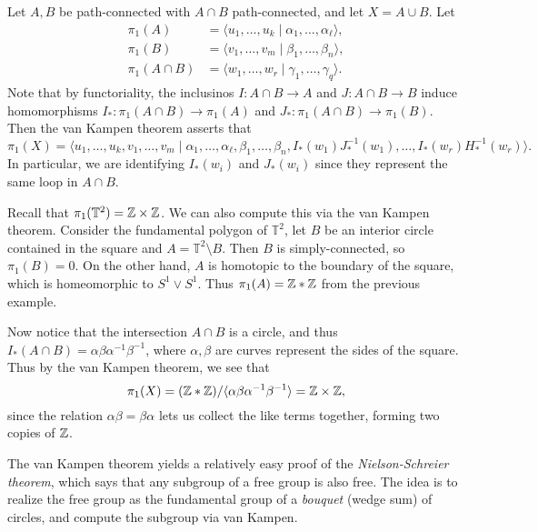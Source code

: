 \begin{example}
  Let $A, B$ be path-connected with
  $A \cap B$ path-connected, and let $X = A \cup B$.
  Let
  \begin{align*}
    \pi_1(A)
    &= \langle u_1, \dots, u_k \mid \alpha_1, \dots, \alpha_\ell\rangle, \\
    \pi_1(B)
    &= \langle v_1, \dots, v_m \mid \beta_1, \dots, \beta_n\rangle, \\
    \pi_1(A \cap B)
    &= \langle w_1, \dots, w_r \mid \gamma_1, \dots, \gamma_q\rangle.
  \end{align*}
  Note that by functoriality, the inclusinos
  $I : A \cap B \to A$ and $J : A \cap B \to B$
  induce homomorphisms
  $I_* : \pi_1(A \cap B) \to \pi_1(A)$ and
  $J_* : \pi_1(A \cap B) \to \pi_1(B)$. Then
  the van Kampen theorem asserts that
  \[
    \pi_1(X)
    = \langle u_1, \dots, u_k, v_1, \dots, v_m \mid
    \alpha_1, \dots, \alpha_\ell, \beta_1, \dots, \beta_n,
    I_*(w_1) J_*^{-1}(w_1), \dots, I_*(w_r) H_*^{-1}(w_r)\rangle.
  \]
  In particular, we are identifying
  $I_*(w_i)$ and $J_*(w_i)$ since they represent
  the same loop in $A \cap B$.
\end{example}

\begin{example}
  Recall that $\pi_1(\mathbb{T}^2) = \mathbb{Z} \times \mathbb{Z}$.
  We can also compute this via the van Kampen theorem.
  Consider the fundamental polygon of
  $\mathbb{T}^2$,
  let $B$ be an interior circle contained in the
  square and
  $A = \mathbb{T}^2 \setminus B$. Then $B$ is
  simply-connected, so $\pi_1(B) = 0$. On the
  other hand, $A$ is homotopic to the
  boundary of the square, which is homeomorphic to
  $S^1 \lor S^1$. Thus $\pi_1(A) = \mathbb{Z} * \mathbb{Z}$ from
  the previous example.

  Now notice that the intersection $A \cap B$ is
  a circle, and thus $I_*(A \cap B) = \alpha \beta \alpha^{-1} \beta^{-1}$,
  where $\alpha, \beta$ are curves
  represent the sides of the square. Thus by
  the van Kampen theorem, we see that
  \[
    \pi_1(X) = (\mathbb{Z} * \mathbb{Z}) / {\langle \alpha \beta \alpha^{-1} \beta^{-1}\rangle} = \mathbb{Z} \times \mathbb{Z},
  \]
  since the relation $\alpha \beta = \beta \alpha$
  lets us collect the like terms together, forming
  two copies of $\mathbb{Z}$.
\end{example}

\begin{remark}
  The van Kampen theorem yields a relatively
  easy proof of the \emph{Nielson-Schreier theorem},
  which says that any subgroup of a free group is
  also free. The idea is to realize the free group
  as the fundamental group of a \emph{bouquet}
  (wedge sum) of circles, and compute the subgroup
  via van Kampen.
\end{remark}
